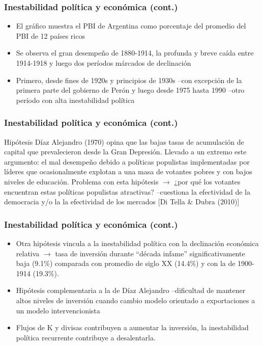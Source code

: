 \documentclass[14pt,aspectratio=169]{beamer}
\begin{document}
 \begin{frame}\frametitle{Inestabilidad política y económica (cont.)}
   \begin{itemize} \itemsep 10pt
   \item El gráfico muestra el PBI de Argentina como porcentaje del
     promedio del PBI de 12 países ricos
     \item Se observa el gran desempeño de 1880-1914, la profunda y
       breve caída entre 1914-1918 y luego dos períodos márcados de
       declinación
       \item Primero, desde fines de 1920s y principios de 1930s --con
         excepción de la primera parte del gobierno de Perón y luego
         desde 1975 hasta 1990 --otro período con alta inestabilidad política
      
   \end{itemize}
          \end{frame}
  


          \begin{frame}\frametitle{Inestabilidad política y económica (cont.)}
            \begin{block}{Hipótesis}
Díaz Alejandro (1970) opina que las bajas tasas de acumulación de
capital que prevalecieron desde la Gran Depresión. Llevado a un
extremo este argumento: el mal desempeño debido a políticas populistas
implementadas por líderes que ocasionalmente explotan a una masa de
votantes pobres y con bajos niveles de educación. Problema con esta hipótesis
$\longrightarrow$ ¿por qué los votantes encuentran estas políticas
populistas atractivas? --cuestiona la efectividad de la democracia y/o
la la efectividad de los mercados [Di Tella \& Dubra (2010)]
            \end{block}               
          \end{frame}
  

\begin{frame}\frametitle{Inestabilidad política y económica (cont.)}
   \begin{itemize} \itemsep 10pt
   \item Otra hipótesis vincula a la inestabilidad política con la
     declinación económica relativa $\longrightarrow$ tasa de
     inversión durante ``década infame'' significativamente baja (9.1\%) comparada con
     promedio de siglo XX (14.4\%) y con la de 1900-1914 (19.3\%). 
         \item Hipótesis  complementaria a la de Díaz
           Alejandro --dificultad de mantener altos niveles de
           inversión cuando cambio modelo orientado a
           exportaciones a un modelo intervencionista
           \item Flujos de K y divisas
             contribuyen a aumentar la inversión, la inestabilidad
             política recurrente contribuye a desalentarla. 
   \end{itemize}
          \end{frame}
          
\end{document}
